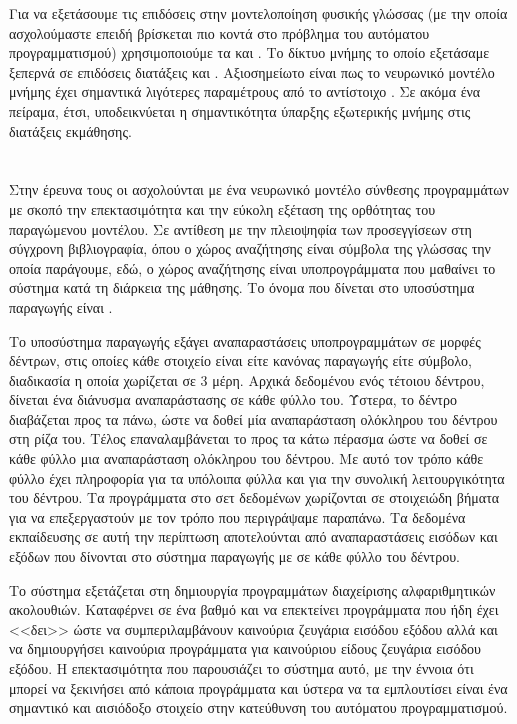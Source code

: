 Για να εξετάσουμε τις επιδόσεις στην μοντελοποίηση φυσικής γλώσσας (με την οποία ασχολούμαστε επειδή βρίσκεται πιο κοντά στο πρόβλημα του αυτόματου προγραμματισμού) χρησιμοποιούμε τα  και . Το δίκτυο μνήμης το οποίο εξετάσαμε ξεπερνά σε επιδόσεις διατάξεις  και . Αξιοσημείωτο είναι πως το νευρωνικό μοντέλο μνήμης έχει σημαντικά λιγότερες παραμέτρους από το αντίστοιχο . Σε ακόμα ένα πείραμα, έτσι, υποδεικνύεται η σημαντικότητα ύπαρξης εξωτερικής μνήμης στις διατάξεις εκμάθησης.

\section{}

Στην έρευνα τους οι  \cite{Parisotto2017} ασχολούνται με ένα νευρωνικό μοντέλο σύνθεσης προγραμμάτων με σκοπό την επεκτασιμότητα και την εύκολη εξέταση της ορθότητας του παραγώμενου μοντέλου.
Σε αντίθεση με την πλειοψηφία των προσεγγίσεων στη σύγχρονη βιβλιογραφία, όπου ο χώρος αναζήτησης είναι σύμβολα της γλώσσας την οποία παράγουμε, εδώ, ο χώρος αναζήτησης είναι υποπρογράμματα που μαθαίνει το σύστημα κατά τη διάρκεια της μάθησης. Το όνομα που δίνεται στο υποσύστημα παραγωγής είναι .


Το υποσύστημα παραγωγής εξάγει αναπαραστάσεις υποπρογραμμάτων σε μορφές δέντρων, στις οποίες κάθε στοιχείο είναι είτε κανόνας παραγωγής είτε σύμβολο, διαδικασία η οποία χωρίζεται σε 3 μέρη.
Αρχικά δεδομένου ενός τέτοιου δέντρου, δίνεται ένα διάνυσμα αναπαράστασης σε κάθε φύλλο του.
Ύστερα, το δέντρο διαβάζεται προς τα πάνω, ώστε να δοθεί μία αναπαράσταση ολόκληρου του δέντρου στη ρίζα του.
Τέλος επαναλαμβάνεται το προς τα κάτω πέρασμα ώστε να δοθεί σε κάθε φύλλο μια αναπαράσταση ολόκληρου του δέντρου.
Με αυτό τον τρόπο κάθε φύλλο έχει πληροφορία για τα υπόλοιπα φύλλα και για την συνολική λειτουργικότητα του δέντρου. Τα προγράμματα στο σετ δεδομένων χωρίζονται σε στοιχειώδη βήματα για να επεξεργαστούν με τον τρόπο που περιγράψαμε παραπάνω. Τα δεδομένα εκπαίδευσης σε αυτή την περίπτωση αποτελούνται από αναπαραστάσεις εισόδων και εξόδων που δίνονται στο σύστημα παραγωγής με σε κάθε φύλλο του δέντρου.

Το σύστημα εξετάζεται στη δημιουργία προγραμμάτων διαχείρισης αλφαριθμητικών ακολουθιών. Καταφέρνει σε ένα βαθμό και να επεκτείνει προγράμματα που ήδη έχει <<δει>> ώστε να συμπεριλαμβάνουν καινούρια ζευγάρια εισόδου εξόδου αλλά και να δημιουργήσει καινούρια προγράμματα για καινούριου είδους ζευγάρια εισόδου εξόδου. Η επεκτασιμότητα που παρουσιάζει το σύστημα αυτό, με την έννοια ότι μπορεί να ξεκινήσει από κάποια προγράμματα και ύστερα να τα εμπλουτίσει είναι ένα σημαντικό και αισιόδοξο στοιχείο στην κατεύθυνση του αυτόματου προγραμματισμού. 

